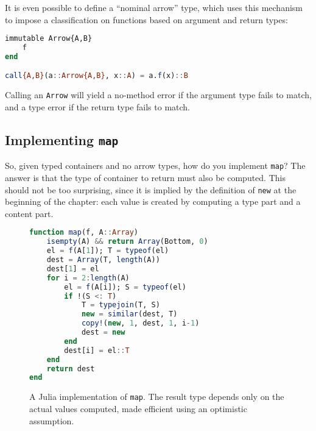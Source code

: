 It is even possible to define a ``nominal arrow'' type, which uses this
mechanism to impose a classification on functions based on argument and
return types:

\begin{singlespace}
\begin{lstlisting}[language=julia]
immutable Arrow{A,B}
    f
end

call{A,B}(a::Arrow{A,B}, x::A) = a.f(x)::B
\end{lstlisting}
\end{singlespace}

\noindent
Calling an \texttt{Arrow} will yield a no-method error if the argument
type fails to match, and a type error if the return type fails to
match.





\subsection{Implementing \texttt{map}}

So, given typed containers and no arrow types, how do you implement
\texttt{map}? The answer is that the type of container to return must
also be computed. This should not be too surprising, since it is implied by
the definition of \texttt{new} at the beginning of the chapter: each
value is created by computing a type part and a content part.

\begin{singlespace}
\begin{figure}
\begin{lstlisting}[language=julia]
function map(f, A::Array)
    isempty(A) && return Array(Bottom, 0)
    el = f(A[1]); T = typeof(el)
    dest = Array(T, length(A))
    dest[1] = el
    for i = 2:length(A)
        el = f(A[i]); S = typeof(el)
        if !(S <: T)
            T = typejoin(T, S)
            new = similar(dest, T)
            copy!(new, 1, dest, 1, i-1)
            dest = new
        end
        dest[i] = el::T
    end
    return dest
end
\end{lstlisting}
  \caption[An implementation of \texttt{map}]{
    A Julia implementation of \texttt{map}.
    The result type depends only on the actual values computed, made
    efficient using an optimistic assumption.
  }
  \label{fig:mapimpl}
\end{figure}
\end{singlespace}

